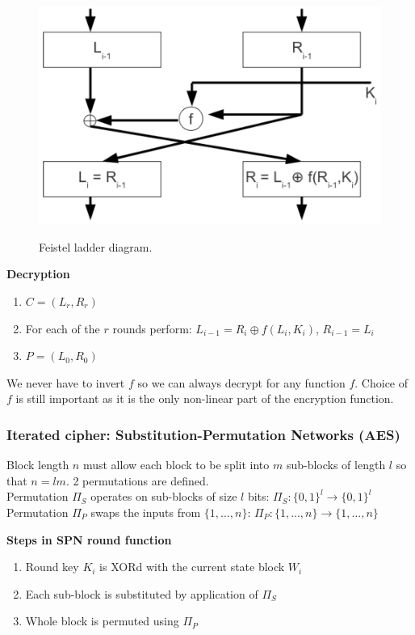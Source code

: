 \documentclass{article}
\begin{document}
\begin{figure}[H]
\centering
\includegraphics[scale=0.55]{Images/feistelladder.png}
\label{fig:feistelladder}
\caption{Feistel ladder diagram.}
\end{figure}

\textbf{Decryption}

\begin{enumerate}
    \item $C = (L_r, R_r)$
    \item For each of the $r$ rounds perform: $L_{i-1} = R_{i} \oplus f(L_i, K_i)$, $R_{i-1} = L_{i}$
    \item $P = (L_0, R_0)$
\end{enumerate}

We never have to invert $f$ so we can always decrypt for any function $f$. Choice of $f$ is still important as it is the only non-linear part of the encryption function.

\subsubsection{Iterated cipher: Substitution-Permutation Networks (AES)}

Block length $n$ must allow each block to be split into $m$ sub-blocks of length $l$ so that $n=lm$. 2 permutations are defined.\\
Permutation $\Pi_S$ operates on sub-blocks of size $l$ bits: $\Pi_S: \{0,1\}^l \rightarrow \{0,1\}^l$\\
Permutation $\Pi_P$ swaps the inputs from $\{1,...,n\}$: $\Pi_P: \{1,...,n\} \rightarrow \{1,...,n\}$

\textbf{Steps in SPN round function}

\begin{enumerate}
    \item Round key $K_i$ is XORd with the current state block $W_i$
    \item Each sub-block is substituted by application of $\Pi_S$
    \item Whole block is permuted using $\Pi_P$
\end{enumerate}
\end{document}
